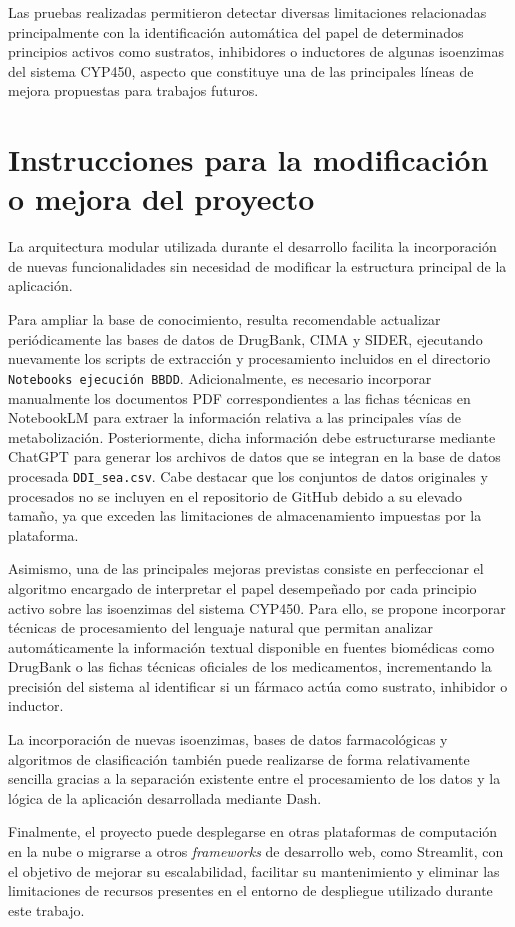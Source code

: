 Las pruebas realizadas permitieron detectar diversas limitaciones relacionadas principalmente con la identificación automática del papel de determinados principios activos como sustratos, inhibidores o inductores de algunas isoenzimas del sistema CYP450, aspecto que constituye una de las principales líneas de mejora propuestas para trabajos futuros.

\section{Instrucciones para la modificación o mejora del proyecto}

La arquitectura modular utilizada durante el desarrollo facilita la incorporación de nuevas funcionalidades sin necesidad de modificar la estructura principal de la aplicación.

Para ampliar la base de conocimiento, resulta recomendable actualizar periódicamente las bases de datos de DrugBank, CIMA y SIDER, ejecutando nuevamente los scripts de extracción y procesamiento incluidos en el directorio \texttt{Notebooks ejecución BBDD}. Adicionalmente, es necesario incorporar manualmente los documentos PDF correspondientes a las fichas técnicas en NotebookLM para extraer la información relativa a las principales vías de metabolización. Posteriormente, dicha información debe estructurarse mediante ChatGPT para generar los archivos de datos que se integran en la base de datos procesada \texttt{DDI\_sea.csv}. Cabe destacar que los conjuntos de datos originales y procesados no se incluyen en el repositorio de GitHub debido a su elevado tamaño, ya que exceden las limitaciones de almacenamiento impuestas por la plataforma.

Asimismo, una de las principales mejoras previstas consiste en perfeccionar el algoritmo encargado de interpretar el papel desempeñado por cada principio activo sobre las isoenzimas del sistema CYP450. Para ello, se propone incorporar técnicas de procesamiento del lenguaje natural que permitan analizar automáticamente la información textual disponible en fuentes biomédicas como DrugBank o las fichas técnicas oficiales de los medicamentos, incrementando la precisión del sistema al identificar si un fármaco actúa como sustrato, inhibidor o inductor.

La incorporación de nuevas isoenzimas, bases de datos farmacológicas y algoritmos de clasificación también puede realizarse de forma relativamente sencilla gracias a la separación existente entre el procesamiento de los datos y la lógica de la aplicación desarrollada mediante Dash.

Finalmente, el proyecto puede desplegarse en otras plataformas de computación en la nube o migrarse a otros \textit{frameworks} de desarrollo web, como Streamlit, con el objetivo de mejorar su escalabilidad, facilitar su mantenimiento y eliminar las limitaciones de recursos presentes en el entorno de despliegue utilizado durante este trabajo.